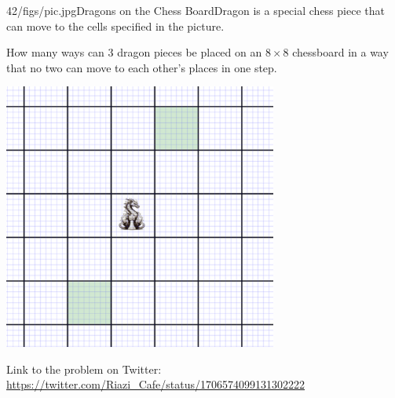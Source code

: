 \begin{problem}{42/figs/pic.jpg}{Dragons on the Chess Board}Dragon is a special chess piece that can move to the cells specified in the picture.

How many ways can 3 dragon pieces be placed on an $8\times8$ chessboard in a way that no two can move to each other's places in one step.

\begin{center}
	\includegraphics[width=9cm]{42/figs/42_dragon.png}
\end{center}


Link to the problem on Twitter:  \url{https://twitter.com/Riazi_Cafe/status/1706574099131302222}\end{problem}